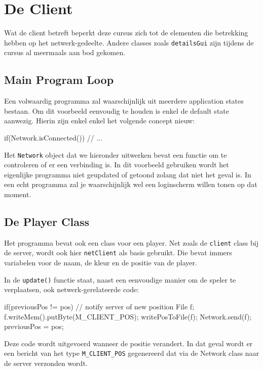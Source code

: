 \chapter{De Client}

Wat de client betreft beperkt deze cursus zich tot de elementen die betrekking hebben op het netwerk-gedeelte. Andere classes zoals \texttt{detailsGui} zijn tijdens de cursus al meermaals aan bod gekomen.

\section{Main Program Loop}

Een volwaardig programma zal waarschijnlijk uit meerdere application states bestaan. Om dit voorbeeld eenvoudig te houden is enkel de default state aanwezig. Hierin zijn enkel enkel het volgende concept nieuw:

\begin{code}
if(Network.isConnected())
{
	// ...
}
\end{code}

Het \texttt{Network} object dat we hieronder uitwerken bevat een functie om te controleren of er een verbinding is. In dit voorbeeld gebruiken wordt het eigenlijke programma niet geupdated of getoond zolang dat niet het geval is. In een echt programma zal je waarschijnlijk wel een loginscherm willen tonen op dat moment.

\section{De Player Class}
Het programma bevat ook een class voor een player. Net zoals de \texttt{client} class bij de server, wordt ook hier \texttt{netClient} als basis gebruikt. Die bevat immers variabelen voor de naam, de kleur en de positie van de player.

In de \texttt{update()} functie staat, naast een eenvoudige manier om de speler te verplaatsen, ook netwerk-gerelateerde code:

\begin{code}
if(previousPos != pos)
{
	 // notify server of new position
	 File f;
	 f.writeMem().putByte(M_CLIENT_POS);
	 writePosToFile(f);
	 Network.send(f);
	 previousPos = pos;
}
\end{code}

Deze code wordt uitgevoerd wanneer de positie verandert. In dat geval wordt er een bericht van het type \texttt{M\_CLIENT\_POS} gegenereerd dat via de Network class naar de server verzonden wordt.

